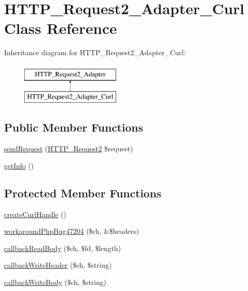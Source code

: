 \hypertarget{classHTTP__Request2__Adapter__Curl}{}\section{H\+T\+T\+P\+\_\+\+Request2\+\_\+\+Adapter\+\_\+\+Curl Class Reference}
\label{classHTTP__Request2__Adapter__Curl}
Inheritance diagram for H\+T\+T\+P\+\_\+\+Request2\+\_\+\+Adapter\+\_\+\+Curl\+:\begin{figure}[H]
\begin{center}
\leavevmode
\includegraphics[height=2.000000cm]{classHTTP__Request2__Adapter__Curl}
\end{center}
\end{figure}
\subsection*{Public Member Functions}
\begin{DoxyCompactItemize}
\item 
\hyperlink{classHTTP__Request2__Adapter__Curl_a9da450eb1bb1492d1b39c22c2f29bb2b}{send\+Request} (\hyperlink{classHTTP__Request2}{H\+T\+T\+P\+\_\+\+Request2} \$request)
\item 
\hyperlink{classHTTP__Request2__Adapter__Curl_a9c8c318ec7a6314f235ef4dfea89e6b2}{get\+Info} ()
\end{DoxyCompactItemize}
\subsection*{Protected Member Functions}
\begin{DoxyCompactItemize}
\item 
\hyperlink{classHTTP__Request2__Adapter__Curl_a905d9fdfe01867e54cbd696091d97516}{create\+Curl\+Handle} ()
\item 
\hyperlink{classHTTP__Request2__Adapter__Curl_a3e62b54a633faf5aba9d0b4eb0a3c1d0}{workaround\+Php\+Bug47204} (\$ch, \&\$headers)
\item 
\hyperlink{classHTTP__Request2__Adapter__Curl_a02043fb25c4aa88dfe000cbb037011b0}{callback\+Read\+Body} (\$ch, \$fd, \$length)
\item 
\hyperlink{classHTTP__Request2__Adapter__Curl_a8279ebf99b6de452d163e747f34d6f11}{callback\+Write\+Header} (\$ch, \$string)
\item 
\hyperlink{classHTTP__Request2__Adapter__Curl_ad1049b669850af2040d3360144f90e8c}{callback\+Write\+Body} (\$ch, \$string)
\end{DoxyCompactItemize}
